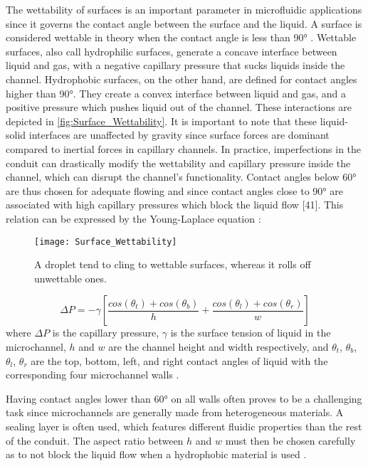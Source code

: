 The wettability of surfaces is an important parameter in microfluidic applications since it governs the contact angle between the surface and the liquid. A surface is considered wettable in theory when the contact angle is less than 90° \cite{Olanrewaju2018}. Wettable surfaces, also call hydrophilic surfaces, generate a concave interface between liquid and gas, with a negative capillary pressure that sucks liquids inside the channel. Hydrophobic surfaces, on the other hand, are defined for contact angles higher than 90°. They create a convex interface between liquid and gas, and a positive pressure which pushes liquid out of the channel. These interactions are depicted in \autoref{fig:Surface_Wettability}. It is important to note that these liquid-solid interfaces are unaffected by gravity since surface forces are dominant compared to inertial forces in capillary channels. In practice, imperfections in the conduit can drastically modify the wettability and capillary pressure inside the channel, which can disrupt the channel’s functionality. Contact angles below 60° are thus chosen for adequate flowing and since contact angles close to 90° are associated with high capillary pressures which block the liquid flow [41]. This relation can be expressed by the Young-Laplace equation \cite{Olanrewaju2018,bruus2011theoretical}:
\begin{figure}[h]
    \centering
    \texttt{[image: Surface\_Wettability]}
    \caption{A droplet tend to cling to wettable surfaces, whereas it rolls off unwettable ones. \citep{surfacewettability}}
    \label{fig:Surface_Wettability}
\end{figure}
\begin{equation}
   \Delta P = -\gamma [\frac{cos(\theta_t)+cos(\theta_b)}{h} + \frac{cos(\theta_l)+cos(\theta_r)}{w}]
\end{equation}
where $\Delta P$ is the capillary pressure, $\gamma$ is the surface tension of liquid in the microchannel, $h$ and $w$ are the channel height and width respectively, and $\theta_t$, $\theta_b$, $\theta_l$, $\theta_r$ are the top, bottom, left, and right contact angles of liquid with the corresponding four microchannel walls \cite{Olanrewaju2018,bruus2011theoretical}. \par

Having contact angles lower than 60° on all walls often proves to be a challenging task since microchannels are generally made from heterogeneous materials. A sealing layer is often used, which features different fluidic properties than the rest of the conduit. The aspect ratio between $h$ and $w$ must then be chosen carefully as to not block the liquid flow when a hydrophobic material is used \cite{Olanrewaju2018}.\par

